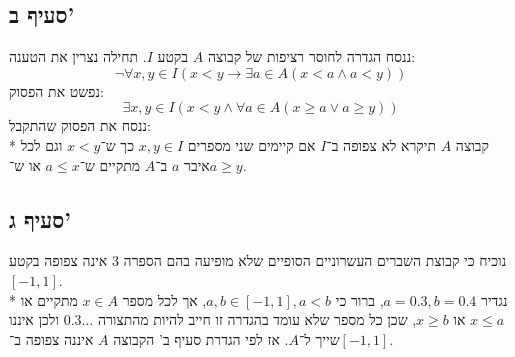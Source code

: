 \subsection{סעיף ב'}
ננסח הגדרה לחוסר רציפות של קבוצה $A$ בקטע $I$.
תחילה נצרין את הטענה:
\[
	\lnot \forall x, y \in I
	(x < y \rightarrow \exists a \in A (x < a \land a < y)) 
\]
נפשט את הפסוק:
\[
	\exists x, y \in I
	(x < y \land \forall a \in A (x \ge a \lor a \ge y))
\]
ננסח את הפסוק שהתקבל: \\*
קבוצה $A$ תיקרא לא צפופה ב־$I$ אם קיימים שני מספרים $x, y \in I$
כך ש־$x < y$ וגם לכל איבר $a$ ב־$A$ מתקיים ש־$a \le x$ או ש־$a \ge y$.

\subsection{סעיף ג'}
נוכיח כי קבוצת השברים העשרוניים הסופיים שלא מופיעה בהם הספרה 3 אינה צפופה בקטע $[-1, 1]$. \\*
נגדיר $a = 0.3, b = 0.4$, ברור כי $a, b \in [-1, 1], a < b$, אך לכל מספר $x \in A$ מתקיים או $x \le a$ או $x \ge b$,
שכן כל מספר שלא עומד בהגדרה זו חייב להיות מהתצורה $0.3\ldots$ ולכן איננו שייך ל־$A$.
אז לפי הגדרת סעיף ב' הקבוצה $A$ איננה צפופה ב־$[-1, 1]$.

